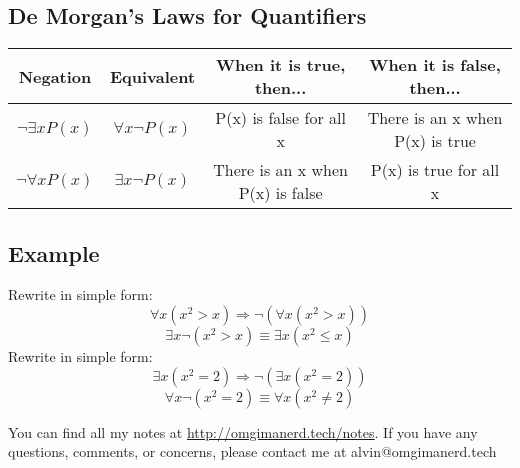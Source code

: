 \documentclass[letterpaper, 12pt]{math}
\begin{document}
\subsection*{De Morgan's Laws for Quantifiers}
\begin{center}
  \begin{tabular}{|c|c|c|c|}
    \hline
    Negation & Equivalent & When it is true, then... &
    When it is false, then... \\ \hline
    \( \neg{\exists{x}P(x)} \) & \( \forall{x}\neg{P(x)} \) &
    P(x) is false for all x & There is an x when P(x) is true \\ \hline
    \( \neg{\forall{x}P(x)} \) & \( \exists{x}\neg{P(x)} \) &
    There is an x when P(x) is false & P(x) is true for all x \\ \hline
  \end{tabular}
\end{center}

\subsection*{Example}
Rewrite in simple form:
\[ \forall{x}(x^{2} > x) \Rightarrow \neg{(\forall{x}(x^{2}>x))} \]
\[ \exists{x}\neg{(x^{2} > x)} \equiv \exists{x}(x^{2} \leq x) \]
Rewrite in simple form:
\[ \exists{x}(x^{2} = 2) \Rightarrow \neg{(\exists{x}(x^{2} = 2))} \]
\[ \forall{x}\neg{(x^{2} = 2)} \equiv \forall{x}(x^{2} \neq 2) \]

\begin{center}
  You can find all my notes at \url{http://omgimanerd.tech/notes}. If you have
  any questions, comments, or concerns, please contact me at
  alvin@omgimanerd.tech
\end{center}
\end{document}
